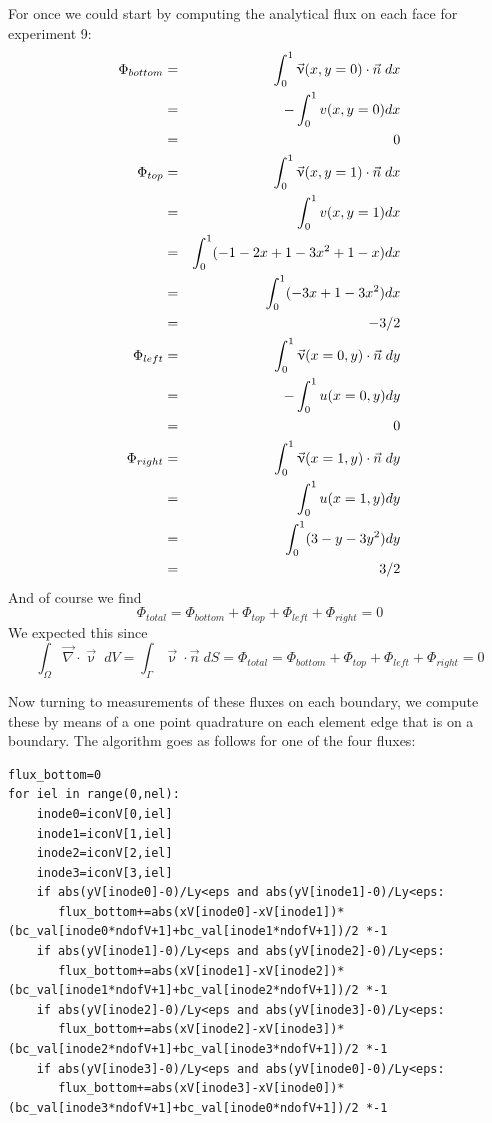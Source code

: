 For once we could start by computing the analytical flux on each face for experiment 9:
\begin{eqnarray}
\Phi_{bottom} 
&=& \int_0^1 \vec{\upnu}(x,y=0) \cdot \vec{n} \; dx \nonumber\\
&=& -\int_0^1 v(x,y=0)  dx \nonumber\\
&=& 0 \nonumber\\
\Phi_{top} 
&=& \int_0^1 \vec{\upnu}(x,y=1) \cdot \vec{n} \; dx \nonumber\\
&=& \int_0^1 v(x,y=1)  dx \nonumber\\
&=& \int_0^1 ( -1-2x+1 -3x^2 + 1 - x ) dx \nonumber\\
&=& \int_0^1 ( -3x+1 -3x^2   ) dx \nonumber\\
&=& -3/2 \nonumber\\
\Phi_{left} 
&=& \int_0^1 \vec{\upnu}(x=0,y) \cdot \vec{n} \; dy \nonumber\\
&=& -\int_0^1 u(x=0,y)  dy \nonumber\\
&=& 0 \nonumber\\
\Phi_{right} 
&=& \int_0^1 \vec{\upnu}(x=1,y) \cdot \vec{n} \; dy \nonumber\\
&=& \int_0^1 u(x=1,y)  dy \nonumber\\
&=& \int_0^1 (3  - y - 3y^2  ) dy \nonumber\\
&=& 3/2 \nonumber
\end{eqnarray}
And of course we find 
\[
\Phi_{total}=\Phi_{bottom}+\Phi_{top} +\Phi_{left}  + \Phi_{right}  =0
\] 
We expected this since
\[
\int_\Omega \vec{\nabla}\cdot \vec{\upnu} \; dV 
= \int_\Gamma \vec{\upnu} \cdot \vec{n} \; dS
=\Phi_{total}=\Phi_{bottom}+\Phi_{top} +\Phi_{left}  + \Phi_{right}  =0
\]

Now turning to measurements of these fluxes on each boundary,
we compute these by means of a one point quadrature on each 
element edge that is on a boundary.
The algorithm goes as follows for one of the four fluxes:
\begin{lstlisting}
flux_bottom=0
for iel in range(0,nel):
    inode0=iconV[0,iel]
    inode1=iconV[1,iel]
    inode2=iconV[2,iel]
    inode3=iconV[3,iel]
    if abs(yV[inode0]-0)/Ly<eps and abs(yV[inode1]-0)/Ly<eps:
       flux_bottom+=abs(xV[inode0]-xV[inode1])*(bc_val[inode0*ndofV+1]+bc_val[inode1*ndofV+1])/2 *-1
    if abs(yV[inode1]-0)/Ly<eps and abs(yV[inode2]-0)/Ly<eps:
       flux_bottom+=abs(xV[inode1]-xV[inode2])*(bc_val[inode1*ndofV+1]+bc_val[inode2*ndofV+1])/2 *-1
    if abs(yV[inode2]-0)/Ly<eps and abs(yV[inode3]-0)/Ly<eps:
       flux_bottom+=abs(xV[inode2]-xV[inode3])*(bc_val[inode2*ndofV+1]+bc_val[inode3*ndofV+1])/2 *-1
    if abs(yV[inode3]-0)/Ly<eps and abs(yV[inode0]-0)/Ly<eps:
       flux_bottom+=abs(xV[inode3]-xV[inode0])*(bc_val[inode3*ndofV+1]+bc_val[inode0*ndofV+1])/2 *-1
\end{lstlisting}
 
